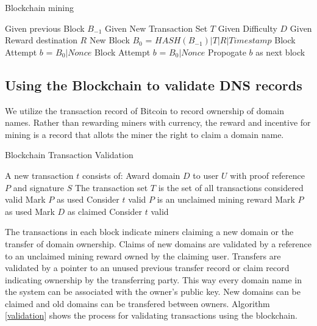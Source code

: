 \documentclass[11pt]{IEEEtran} %
\begin{document}
\begin{algorithm}
\caption{Blockchain mining}
\label{mining}
\begin{algorithmic}[1]  %
\STATE Given previous Block $B_{-1}$
\STATE Given New Transaction Set $T$
\STATE Given Difficulty $D$
\STATE Given Reward destination $R$
\STATE New Block $B_0$ = $HASH(B_{-1})|T|R|Timestamp$
\STATE Block Attempt $b$ = $B_0|Nonce$
	\STATE Block Attempt $b$ = $B_0|Nonce$
\ENDWHILE
\STATE Propogate $b$ as next block
\end{algorithmic}
\end{algorithm}


\subsection{Using the Blockchain to validate DNS records}
We utilize the transaction record of Bitcoin to record ownership of domain names. Rather than rewarding miners with currency,  the reward and incentive for mining is a record that allots the miner the right to claim a domain name.  


\begin{algorithm}
\caption{Blockchain Transaction Validation}
\label{validation}
\begin{algorithmic}[1]  %
\STATE A new transaction $t$ consists of: Award domain $D$ to user $U$ with proof reference $P$ and signature $S$
\STATE The transaction set $T$ is the set of all transactions considered valid
    		\STATE Mark $P$ as used
            \STATE Consider $t$ valid
        \ELSE
            	\STATE $P$ is an unclaimed mining reward
                	\STATE Mark $P$ as used
                    \STATE Mark $D$ as claimed
                    \STATE Consider $t$ valid
                \ENDIF
			\ENDIF
         \ENDIF
    \ENDIF
\ENDIF
\end{algorithmic}
\end{algorithm}

The transactions in each block indicate miners claiming a new domain or the transfer of domain ownership. Claims of new domains are validated by a reference to an unclaimed mining reward owned by the claiming user. Transfers are validated by a pointer to an unused previous transfer record or claim record indicating ownership by the transferring party. This way every domain name in the system can be associated with the owner's public key. New domains can be claimed and old domains can be transfered between owners.
Algorithm \ref{validation} shows the process for validating transactions using the blockchain.
\end{document}
